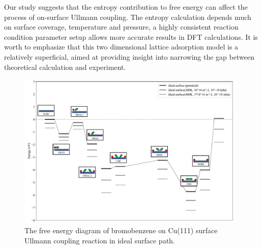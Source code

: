 \documentclass[%
 reprint,
 amsmath,amssymb,
 aps,
prb,
floatfix,
]{revtex4-2}
\begin{document}
{Our study suggests that the entropy contribution to free energy can affect the process of on-surface Ullmann coupling. The entropy calculation depends much on surface coverage, temperature and pressure, a highly consistent reaction condition parameter setup allows more accurate results in DFT calculations. It is worth to emphasize that this two dimensional lattice adsorption model is a relatively superficial, aimed at providing insight into narrowing the gap between theoretical calculation and experiment. 
}
\begin{figure}[hbt]
\centering
\includegraphics[width=0.98\textwidth]{Fig/entropy-correction.pdf}
\caption{The free energy diagram of bromobenzene on Cu(111) surface Ullmann coupling reaction in ideal surface path.}
\label{fig:entropy}
\end{figure}

\fi
\end{document}
